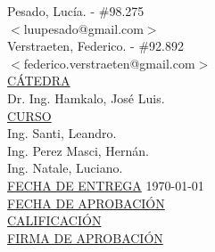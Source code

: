 \begin{titlepage}
\begin{tabbing}
		Pesado, Lucía.	\>\>- \#98.275\\
		\>\footnotesize{$<$luupesado@gmail.com$>$}\\

		Verstraeten, Federico.	\>\>- \#92.892\\
		\>\footnotesize{$<$federico.verstraeten@gmail.com$>$}\\

		\<\underline{CÁTEDRA}\\[0.2cm]
		Dr. Ing. Hamkalo, José Luis. \\

		\<\underline{CURSO}\\[0.2cm]
		Ing. Santi, Leandro. \\
		Ing. Perez Masci, Hernán. \\
		Ing. Natale, Luciano. \\[1cm]

		\<\underline{FECHA DE ENTREGA}\>\>\> \today
		\\[0.2cm]

		\<\underline{FECHA DE APROBACIÓN}\>\>\>
		\\[0.2cm]

		\<\underline{CALIFICACIÓN}\>\>\>
		\\[0.2cm]

		\<\underline{FIRMA DE APROBACIÓN}
		\\[0.5cm]

	\end{tabbing}




\end{titlepage}

\clearpage

\tableofcontents

\clearpage



